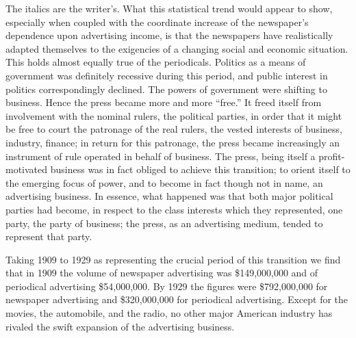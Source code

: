 \documentclass[twoside,nohyper,openany,nobib]{tufte-book}
\begin{document}
The italics are the writer's. What this statistical trend would appear
to show, especially when coupled with the coordinate increase of the
newspaper's dependence upon advertising income, is that the newspapers
have realistically adapted themselves to the exigencies of a changing
social and economic situation. This holds almost equally true of the
periodicals. Politics as a means of government was definitely recessive
during this period, and public interest in politics correspondingly
declined. The powers of government were shifting to business. Hence the
press became more and more ``free.'' It freed itself from involvement
with the nominal rulers, the political parties, in order that it might
be free to court the patronage of the real rulers, the vested interests
of business, industry, finance; in return for this patronage, the press
became increasingly an instrument of rule operated in behalf of
business. The press, being itself a profit-motivated business was in
fact obliged to achieve this transition; to orient itself to the
emerging focus of power, and to become in fact though not in name, an
advertising business. In essence, what happened was that both major
political parties had become, in respect to the class interests which
they represented, one party, the party of business; the press, as an
advertising medium, tended to represent that party.

Taking 1909 to 1929 as representing the crucial period of this
transition we find that in 1909 the volume of newspaper advertising was
\$149,000,000 and of periodical advertising \$54,000,000. By 1929 the
figures were \$792,000,000 for newspaper advertising and \$320,000,000
for periodical advertising. Except for the movies, the automobile, and
the radio, no other major American industry has rivaled the swift
expansion of the advertising business.
\end{document}
